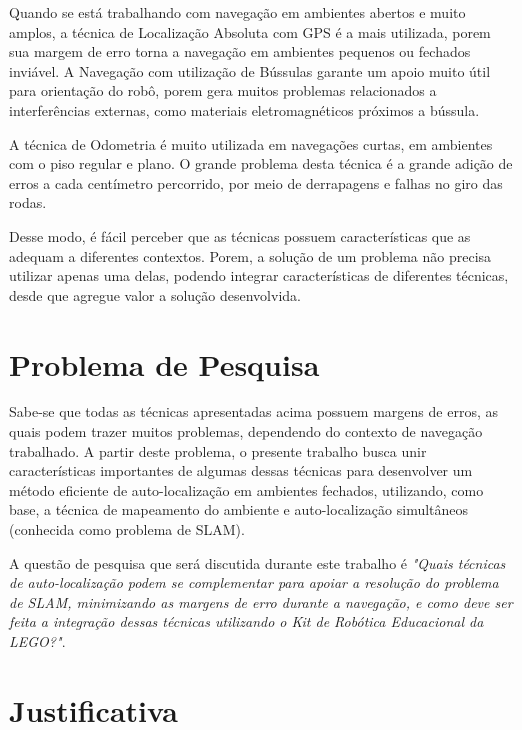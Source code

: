 	Quando se está trabalhando com navegação em ambientes abertos e muito amplos, a técnica de Localização Absoluta com GPS é a mais utilizada, porem sua margem de erro torna a navegação em ambientes pequenos ou fechados inviável. A Navegação com utilização de Bússulas garante um apoio muito útil para orientação do robô, porem gera muitos problemas relacionados a interferências externas, como materiais eletromagnéticos próximos a bússula.
	
	A técnica de Odometria é muito utilizada em navegações curtas, em ambientes com o piso regular e plano. O grande problema desta técnica é a grande adição de erros a cada centímetro percorrido, por meio de derrapagens e falhas no giro das rodas. 

	Desse modo, é fácil perceber que as técnicas possuem características que as adequam a diferentes contextos. Porem, a solução de um problema não precisa utilizar apenas uma delas, podendo integrar características de diferentes técnicas, desde que agregue valor a solução desenvolvida.

\section{Problema de Pesquisa}

	Sabe-se que todas as técnicas apresentadas acima possuem margens de erros, as quais podem trazer muitos problemas, dependendo do contexto de navegação trabalhado. A partir deste problema, o presente trabalho busca unir características importantes de algumas dessas técnicas para desenvolver um método eficiente de auto-localização em ambientes fechados, utilizando, como base, a técnica de mapeamento do ambiente e auto-localização simultâneos (conhecida como problema de SLAM).

	A questão de pesquisa que será discutida durante este trabalho é \textit{"Quais técnicas de auto-localização podem se complementar para apoiar a resolução do problema de SLAM, minimizando as margens de erro durante a navegação, e como deve ser feita a integração dessas técnicas utilizando o Kit de Robótica Educacional da LEGO?"}.

\section{Justificativa}


